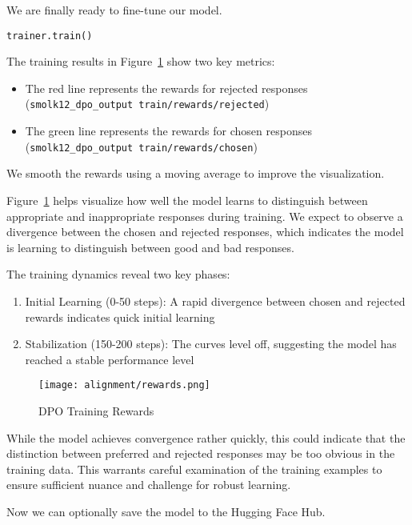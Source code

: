 We are finally ready to fine-tune our model.

\begin{verbatim}
trainer.train()
\end{verbatim}

The training results in Figure~\ref{fig:rewards} show two key metrics:

\begin{itemize}
\item The red line represents the rewards for rejected responses (\texttt{smolk12\_dpo\_output train/rewards/rejected})
\item The green line represents the rewards for chosen responses (\texttt{smolk12\_dpo\_output train/rewards/chosen})
\end{itemize}

We smooth the rewards using a moving average to improve the visualization.


Figure~\ref{fig:rewards} helps visualize how well the model learns to distinguish between appropriate and inappropriate responses during training. We expect to observe a divergence between the chosen and rejected responses, which indicates the model is learning to distinguish between good and bad responses.

The training dynamics reveal two key phases:

\begin{enumerate}
\item Initial Learning (0-50 steps): A rapid divergence between chosen and rejected rewards indicates quick initial learning
\item Stabilization (150-200 steps): The curves level off, suggesting the model has reached a stable performance level
\end{enumerate}

\begin{figure}[H]
    \centering
    \texttt{[image: alignment/rewards.png]}
    \caption{DPO Training Rewards}
    \label{fig:rewards}
\end{figure}
    

While the model achieves convergence rather quickly, this could indicate that the distinction between preferred and rejected responses may be too obvious in the training data. This warrants careful examination of the training examples to ensure sufficient nuance and challenge for robust learning.

Now we can optionally save the model to the Hugging Face Hub.

